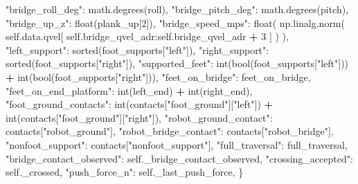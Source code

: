 \documentclass[
  chinese,
  11pt,
  letterpaper,
]{article}
\newenvironment{Shaded}{\begin{snugshade}}{\end{snugshade}}
\newcommand{\BuiltInTok}[1]{#1}
\newcommand{\DecValTok}[1]{\textcolor[rgb]{0.00,0.00,0.81}{#1}}
\newcommand{\NormalTok}[1]{#1}
\newcommand{\OperatorTok}[1]{\textcolor[rgb]{0.81,0.36,0.00}{\textbf{#1}}}
\newcommand{\StringTok}[1]{\textcolor[rgb]{0.31,0.60,0.02}{#1}}
\newcommand{\VariableTok}[1]{\textcolor[rgb]{0.00,0.00,0.00}{#1}}
\renewenvironment{Shaded}{\par\smallskip}{\par\smallskip}
\begin{document}
\begin{Shaded}
\begin{Highlighting}[]
            \StringTok{"bridge\_roll\_deg"}\NormalTok{: math.degrees(roll),}
            \StringTok{"bridge\_pitch\_deg"}\NormalTok{: math.degrees(pitch),}
            \StringTok{"bridge\_up\_z"}\NormalTok{: }\BuiltInTok{float}\NormalTok{(plank\_up[}\DecValTok{2}\NormalTok{]),}
            \StringTok{"bridge\_speed\_mps"}\NormalTok{: }\BuiltInTok{float}\NormalTok{(}
\NormalTok{                np.linalg.norm(}
                    \VariableTok{self}\NormalTok{.data.qvel[}
                        \VariableTok{self}\NormalTok{.bridge\_qvel\_adr:}\VariableTok{self}\NormalTok{.bridge\_qvel\_adr }\OperatorTok{+} \DecValTok{3}
\NormalTok{                    ]}
\NormalTok{                )}
\NormalTok{            ),}
            \StringTok{"left\_support"}\NormalTok{: }\BuiltInTok{sorted}\NormalTok{(foot\_supports[}\StringTok{"left"}\NormalTok{]),}
            \StringTok{"right\_support"}\NormalTok{: }\BuiltInTok{sorted}\NormalTok{(foot\_supports[}\StringTok{"right"}\NormalTok{]),}
            \StringTok{"supported\_feet"}\NormalTok{: }\BuiltInTok{int}\NormalTok{(}\BuiltInTok{bool}\NormalTok{(foot\_supports[}\StringTok{"left"}\NormalTok{]))}
            \OperatorTok{+} \BuiltInTok{int}\NormalTok{(}\BuiltInTok{bool}\NormalTok{(foot\_supports[}\StringTok{"right"}\NormalTok{])),}
            \StringTok{"feet\_on\_bridge"}\NormalTok{: feet\_on\_bridge,}
            \StringTok{"feet\_on\_end\_platform"}\NormalTok{: }\BuiltInTok{int}\NormalTok{(left\_end) }\OperatorTok{+} \BuiltInTok{int}\NormalTok{(right\_end),}
            \StringTok{"foot\_ground\_contacts"}\NormalTok{: }\BuiltInTok{int}\NormalTok{(contacts[}\StringTok{"foot\_ground"}\NormalTok{][}\StringTok{"left"}\NormalTok{])}
            \OperatorTok{+} \BuiltInTok{int}\NormalTok{(contacts[}\StringTok{"foot\_ground"}\NormalTok{][}\StringTok{"right"}\NormalTok{]),}
            \StringTok{"robot\_ground\_contact"}\NormalTok{: contacts[}\StringTok{"robot\_ground"}\NormalTok{],}
            \StringTok{"robot\_bridge\_contact"}\NormalTok{: contacts[}\StringTok{"robot\_bridge"}\NormalTok{],}
            \StringTok{"nonfoot\_support"}\NormalTok{: contacts[}\StringTok{"nonfoot\_support"}\NormalTok{],}
            \StringTok{"full\_traversal"}\NormalTok{: full\_traversal,}
            \StringTok{"bridge\_contact\_observed"}\NormalTok{: }\VariableTok{self}\NormalTok{.\_bridge\_contact\_observed,}
            \StringTok{"crossing\_accepted"}\NormalTok{: }\VariableTok{self}\NormalTok{.\_crossed,}
            \StringTok{"push\_force\_n"}\NormalTok{: }\VariableTok{self}\NormalTok{.\_last\_push\_force,}
\NormalTok{        \}}


\end{Highlighting}
\end{Shaded}
\end{document}
